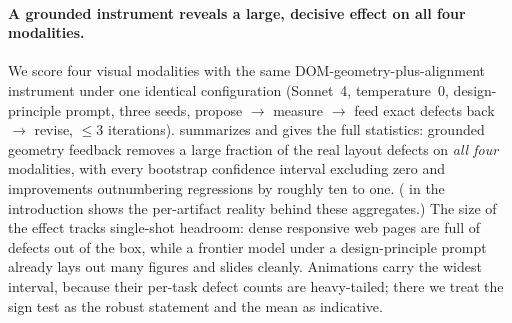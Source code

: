 \paragraph{A grounded instrument reveals a large, decisive effect on all four modalities.} We score four visual modalities with the same DOM-geometry-plus-alignment instrument under one identical configuration (Sonnet~4, temperature~$0$, design-principle prompt, three seeds, propose $\to$ measure $\to$ feed exact defects back $\to$ revise, $\le3$ iterations).  summarizes and  gives the full statistics: grounded geometry feedback removes a large fraction of the real layout defects on \emph{all four} modalities, with every bootstrap confidence interval excluding zero and improvements outnumbering regressions by roughly ten to one. ( in the introduction shows the per-artifact reality behind these aggregates.) The size of the effect tracks single-shot headroom: dense responsive web pages are full of defects out of the box, while a frontier model under a design-principle prompt already lays out many figures and slides cleanly. Animations carry the widest interval, because their per-task defect counts are heavy-tailed; there we treat the sign test as the robust statement and the mean as indicative.

